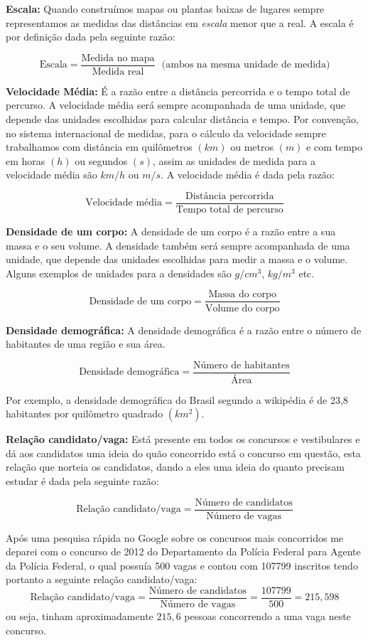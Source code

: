 \textbf{Escala:} Quando construímos mapas ou plantas baixas de lugares sempre representamos as medidas das distâncias em \textit{escala} menor que a real. A escala é por definição dada pela seguinte razão:

\[\text{Escala}= \frac{\text{Medida no mapa}}{\text{Medida real}} \ \ \ \text{(ambos na mesma unidade de medida)}\]

\textbf{Velocidade Média:} É a razão entre a distância percorrida e o tempo total de percurso. A velocidade média será sempre acompanhada de uma unidade, que depende das unidades escolhidas para calcular distância e tempo. Por convenção, no sistema internacional de medidas, para o cálculo da velocidade sempre trabalhamos com distância em quilômetros $(km)$ ou metros $(m)$ e com tempo em horas $(h)$ ou segundos $(s)$, assim as unidades de medida para a velocidade média são $km/h$ ou $m/s$. A velocidade média é dada pela razão:

\[\text{Velocidade média}= \frac{\text{Distância percorrida}}{\text{Tempo total de percurso}}\]

\textbf{Densidade de um corpo:} A densidade de um corpo é a razão entre a sua massa e o seu volume. A densidade também será sempre acompanhada de uma unidade, que depende das unidades escolhidas para medir a massa e o volume. Alguns exemplos de unidades para a densidades são $g/cm^3$, $kg/m^3$ etc.

\[\text{Densidade de um corpo}= \frac{\text{Massa do corpo}}{\text{Volume do corpo}}\]

\textbf{Densidade demográfica:} A densidade demográfica é a razão entre o número de habitantes de uma região e sua área.

\[\text{Densidade demográfica}= \frac{\text{Número de habitantes}}{\text{Área}}\]

Por exemplo, a densidade demográfica do Brasil segundo a wikipédia é de 23,8 habitantes por quilômetro quadrado $(km^2)$.

\textbf{Relação candidato/vaga:} Está presente em todos os concursos e vestibulares e dá aos candidatos uma ideia do quão concorrido está o concurso em questão, esta relação que norteia os candidatos, dando a eles uma ideia do quanto precisam estudar é dada pela seguinte razão:

\[\text{Relação candidato/vaga}= \frac{\text{Número de candidatos}}{\text{Número de vagas}}\]

\begin{exem}
 Após uma pesquisa rápida no Google sobre os concursos mais concorridos me deparei com o concurso de 2012 do Departamento da Polícia Federal para Agente da Polícia Federal, o qual possuía 500 vagas e contou com 107799 inscritos tendo portanto a seguinte relação candidato/vaga:
 \[\text{Relação candidato/vaga}= \frac{\text{Número de candidatos}}{\text{Número de vagas}}= \frac{107799}{500}= 215,598\]
 ou seja, tinham aproximadamente $215,6$ pessoas concorrendo a uma vaga neste concurso.

 \fim
\end{exem}


